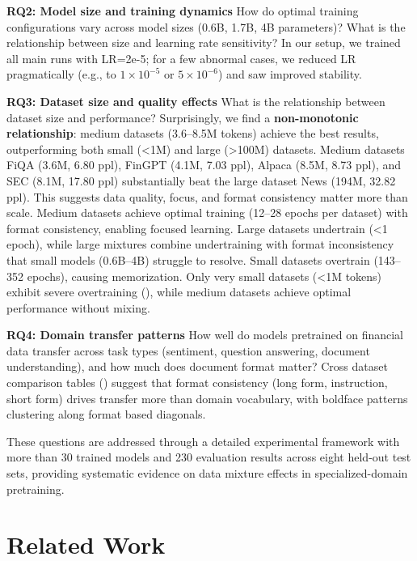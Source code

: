 \textbf{RQ2: Model size and training dynamics}
How do optimal training configurations vary across model sizes (0.6B, 1.7B, 4B parameters)? What is the relationship between size and learning rate sensitivity? In our setup, we trained all main runs with LR=2e-5; for a few abnormal cases, we reduced LR pragmatically (e.g., to $1\times10^{-5}$ or $5\times10^{-6}$) and saw improved stability.

\textbf{RQ3: Dataset size and quality effects}
What is the relationship between dataset size and performance? Surprisingly, we find a \textbf{non-monotonic relationship}: medium datasets (3.6–8.5M tokens) achieve the best results, outperforming both small (<1M) and large (>100M) datasets. Medium datasets FiQA (3.6M, 6.80 ppl), FinGPT (4.1M, 7.03 ppl), Alpaca (8.5M, 8.73 ppl), and SEC (8.1M, 17.80 ppl) substantially beat the large dataset News (194M, 32.82 ppl). This suggests data quality, focus, and format consistency matter more than scale. Medium datasets achieve optimal training (12–28 epochs per dataset) with format consistency, enabling focused learning. Large datasets undertrain (<1 epoch), while large mixtures combine undertraining with format inconsistency that small models (0.6B–4B) struggle to resolve. Small datasets overtrain (143–352 epochs), causing memorization. Only very small datasets (<1M tokens) exhibit severe overtraining (), while medium datasets achieve optimal performance without mixing.

\textbf{RQ4: Domain transfer patterns}
How well do models pretrained on financial data transfer across task types (sentiment, question answering, document understanding), and how much does document format matter? Cross dataset comparison tables () suggest that format consistency (long form, instruction, short form) drives transfer more than domain vocabulary, with boldface patterns clustering along format based diagonals.

These questions are addressed through a detailed experimental framework with more than 30 trained models and 230 evaluation results across eight held-out test sets, providing systematic evidence on data mixture effects in specialized-domain pretraining.

\section{Related Work}


